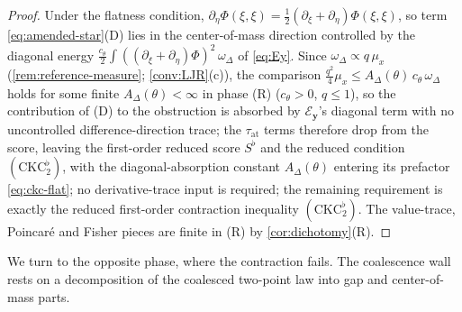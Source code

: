\documentclass[reqno,final,11pt]{amsart}
\theoremstyle{plain}
\theoremstyle{definition}
\theoremstyle{remark}
\newcommand{\cE}{\mathcal E}
\begin{document}
\begin{proof}
Under the flatness condition,
$\partial_\eta\Phi(\xi,\xi)=\tfrac12(\partial_\xi+\partial_\eta)\Phi(\xi,\xi)$,
so term \eqref{eq:amended-star}\textnormal{(D)} lies in the center-of-mass
direction controlled by the diagonal energy
$\tfrac{c_\theta}{2}\int((\partial_\xi+\partial_\eta)\Phi)^2\,\omega_\Delta$ of
\eqref{eq:Ey}. Since $\omega_\Delta\propto q\,\mu_x$
(\cref{rem:reference-measure}; \cref{conv:LJR}(c)), the comparison
$\tfrac{q^2}{4}\mu_x\le A_\Delta(\theta)\,c_\theta\,\omega_\Delta$ holds for some
finite $A_\Delta(\theta)<\infty$ in phase \textnormal{(R)} ($c_\theta>0$,
$q\le1$), so the contribution of \textnormal{(D)} to the obstruction is absorbed
by $\cE_{\mathbf y}$'s diagonal term with no uncontrolled difference-direction
trace; the $\tau_{\mathrm{at}}$ terms therefore drop from the score, leaving the
first-order reduced score $S^{\flat}$ and the reduced condition
$(\mathrm{CKC}_2^{\flat})$, with the diagonal-absorption constant
$A_\Delta(\theta)$ entering its prefactor \eqref{eq:ckc-flat}; no derivative-trace
input is required; the remaining requirement is exactly the reduced first-order
contraction inequality $(\mathrm{CKC}_2^{\flat})$. The value-trace, Poincar\'e and
Fisher pieces are finite in (R) by \cref{cor:dichotomy}(R).
\end{proof}

We turn to the opposite phase, where the contraction fails. The coalescence wall
rests on a decomposition of the coalesced two-point law into gap and
center-of-mass parts.
\end{document}
